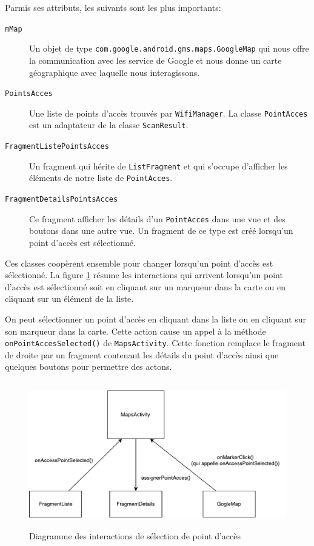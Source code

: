 \documentclass[12pt]{article}
\newcommand\code[1]{\texttt{#1}}
\begin{document}
	Parmis ses attributs, les suivants sont les plus importants:
	\begin{description}
		\item[\code{mMap}]

			Un objet de type \code{com.google.android.gms.maps.GoogleMap} qui
			nous offre la communication avec les service de Google et nous donne
			un carte géographique avec laquelle nous interagissons.

		\item[\code{PointsAcces}]

			Une liste de points d'accès trouvés par \code{WifiManager}.  La
			classe \code{PointAcces} est un adaptateur de la classe
			\code{ScanResult}.

		\item[\code{FragmentListePointsAcces}]

			Un fragment qui hérite de \code{ListFragment} et qui s'occupe
			d'afficher les éléments de notre liste de \code{PointAcces}.

		\item[\code{FragmentDetailsPointsAcces}]

			Ce fragment afficher les détails d'un \code{PointAcces} dans une
			vue et des boutons dans une autre vue.  Un fragment de ce type est
			créé lorsqu'un point d'accès est sélectionné.
	\end{description}

	Ces classes coopèrent ensemble pour changer lorsqu'un point d'accès est
	sélectionné.  La figure \ref{fig_interaction} résume les interactions qui
	arrivent lorsqu'un point d'accès est sélectionné soit en cliquant sur un
	marqueur dans la carte ou en cliquant sur un élément de la liste.

	On peut sélectionner un point d'accès en cliquant dans la liste ou en
	cliquant sur son marqueur dans la carte.  Cette action cause un appel à la
	méthode \code{onPointAccesSelected()} de \code{MapsActivity}.  Cette
	fonction remplace le fragment de droite par un fragment contenant les
	détails du point d'accès ainsi que quelques boutons pour permettre des
	actons.

	\begin{figure}[h]
		\centering
		\includegraphics[height=2.5in]{communication_diag.pdf}
		\caption{Diagramme des interactions de sélection de point d'accès}
		\label{fig_interaction}
	\end{figure}
\end{document}
